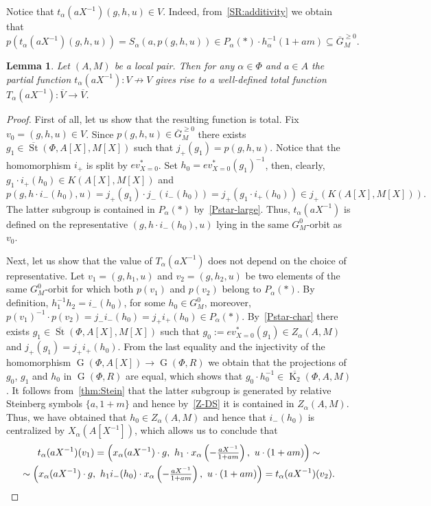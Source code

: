 \documentclass[oneside, 8pt]{amsart}
\newtheorem{lemma}{Lemma}
\theoremstyle{remark}
\theoremstyle{definition}
\numberwithin{lemma}{section}
\numberwithin{prop}{section}
\numberwithin{corollary}{section}
\numberwithin{externaltheorem}{section}
\DeclareMathOperator{\St}{St}
\DeclareMathOperator{\K}{K}
\DeclareMathOperator{\GG}{G}
\numberwithin{equation}{section}
\begin{document}
Notice that $t_\alpha(aX^{-1}) (g, h, u) \in V$. Indeed, from~\cref{SR:additivity} we obtain that
\[p\left(t_\alpha(aX^{-1}) (g, h, u)\right) = S_\alpha(a, p(g, h, u)) \in P_\alpha(*) \cdot h_{\alpha}^{-1}(1+am) \subseteq \overline{G}_M^{\geq 0}.\]
\begin{lemma}\label{lem:orbit-action} Let $(A, M)$ be a local pair. 
Then for any $\alpha \in \Phi$ and $a \in A$ the partial function $t_\alpha(aX^{-1}) \colon V \not \to V$ gives rise to a well-defined total function $T_\alpha(aX^{-1}) \colon \overline{V} \to \overline{V}$. \end{lemma}
\begin{proof}
 First of all, let us show that the resulting function is total. 
 Fix $v_0 = (g, h, u) \in V$. Since $p(g, h, u) \in \overline{G}^{\geq 0}_M$ there exists $g_1 \in \overline{\St}(\Phi, A[X], M[X])$ such that $j_+(g_1) = p(g, h, u).$ Notice that the homomorphism $i_+$ is split by $ev^*_{X=0}$.
 Set $h_0 = ev^*_{X=0}(g_1)^{-1}$, then, clearly, $g_1 \cdot i_+(h_0) \in K(A[X], M[X])$ and 
 $p(g, h \cdot i_-(h_0), u) = j_+(g_1) \cdot j_-(i_-(h_0)) = j_+(g_1 \cdot i_+(h_0)) \in j_+(K(A[X], M[X])).$ The latter subgroup is contained in $P_\alpha(*)$ by~\cref{Pstar-large}. Thus, $t_\alpha(aX^{-1})$ is defined on the representative $(g, h \cdot i_-(h_0), u)$ lying in the same $G_M^0$-orbit as $v_0$.
  
 Next, let us show that the value of $T_\alpha(aX^{-1})$ does not depend on the choice of representative.
 Let $v_1 = (g, h_1, u)$ and $v_2 = (g, h_2, u)$ be two elements of the same $G_M^0$-orbit for which both $p(v_1)$ and $p(v_2)$ belong to $P_\alpha(*)$.
 By definition, $h_1^{-1} h_2 = i_-(h_0)$, for some $h_0 \in G^0_M$, moreover, 
  $p(v_1)^{-1} \cdot p(v_2) = j_- i_-(h_0) = j_+ i_+(h_0) \in P_\alpha(*)$.
 By~\cref{Pstar-char} there exists $g_1 \in \overline{\St}(\Phi, A[X], M[X])$ such that $g_0 := ev^*_{X=0}(g_1) \in Z_\alpha(A, M)$ and $j_+(g_1) = j_+ i_+ (h_0)$.
 From the last equality and the injectivity of the homomorphism $\GG(\Phi, A[X]) \to \GG(\Phi, R)$ we obtain that the projections of $g_0$, $g_1$ and $h_0$ in $\GG(\Phi, R)$ are equal, which shows that $g_0 \cdot h_0^{-1} \in \overline{\K_2}(\Phi, A, M)$. It follows from~\cref{thm:Stein} that the latter subgroup is generated by relative Steinberg symbols $\{ a, 1 + m \}$ and hence by~\cref{Z-DS} it is contained in $Z_\alpha(A, M)$. Thus, we have obtained that $h_0 \in Z_\alpha(A, M)$ and hence that $i_-(h_0)$ is centralized by $X_\alpha(A[X^{-1}])$, which allows us to conclude that
 \begin{multline} \nonumber
  t_\alpha(aX^{-1})(v_1) = \left( x_\alpha(aX^{-1})\cdot g ,\ h_1 \cdot x_\alpha\left(-\tfrac{aX^{-1}}{1 + am}\right),\ u \cdot (1 + am)\right) \sim \\
  \sim \left( x_\alpha(aX^{-1})\cdot g ,\ h_1 i_-(h_0) \cdot x_\alpha\left(-\tfrac{aX^{-1}}{1 + am}\right),\ u \cdot (1 + am)\right) = t_\alpha(aX^{-1})(v_2). \qedhere
 \end{multline}\end{proof}
\end{document}
